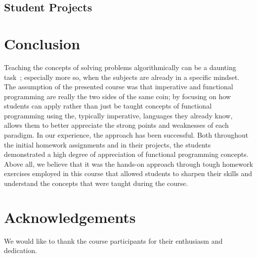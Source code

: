 \documentclass[conference]{IEEEtran}
\begin{document}
\subsection{Student Projects}

\section{Conclusion}

Teaching the concepts of solving problems algorithmically can be a daunting
task~\cite{Futsc06}; especially more so, when the subjects are already in a
specific mindset. The assumption of the presented course was that imperative and
functional programming are really the two sides of the same coin; by focusing on
how students can apply rather than just be taught concepts of functional
programming using the, typically imperative, languages they already know, allows
them to better appreciate the strong points and weaknesses of each paradigm. In
our experience, the approach has been successful. Both throughout the initial
homework assignments and in their projects, the students demonstrated a high
degree of appreciation of functional programming concepts. Above all, we
believe that it was the hands-on approach through tough homework exercises
employed in this course that allowed students to sharpen their skills and
understand the concepts that were taught during the course.

\section*{Acknowledgements}

We would like to thank the course participants for their enthusiasm and
dedication.



\end{document}
